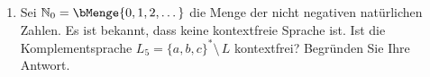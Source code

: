 \documentclass{bschlangaul-aufgabe}
\begin{document}
\begin{enumerate}

\item Sei $\mathbb{N}_0 = \bMenge{0,1,2,\dots}$ die Menge der nicht
negativen natürlichen Zahlen. Es ist bekannt, dass  keine kontextfreie Sprache ist. Ist die
Komplementsprache $L_5 = \{a, b, c \}^* \setminus \, L$ kontextfrei?
Begründen Sie Ihre Antwort.

\end{enumerate}
\end{document}
